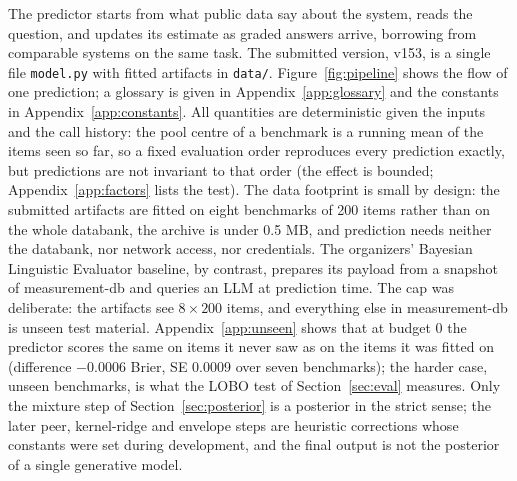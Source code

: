 \documentclass{article}
\begin{document}
The predictor starts from what public data say about the system, reads the question, and updates its estimate as graded answers arrive, borrowing from comparable systems on the same task. The submitted version, v153, is a single file \texttt{model.py} with fitted artifacts in \texttt{data/}. Figure~\ref{fig:pipeline} shows the flow of one prediction; a glossary is given in Appendix~\ref{app:glossary} and the constants in Appendix~\ref{app:constants}. All quantities are deterministic given the inputs and the call history: the pool centre of a benchmark is a running mean of the items seen so far, so a fixed evaluation order reproduces every prediction exactly, but predictions are not invariant to that order (the effect is bounded; Appendix~\ref{app:factors} lists the test). The data footprint is small by design: the submitted artifacts are fitted on eight benchmarks of 200 items rather than on the whole databank, the archive is under 0.5 MB, and prediction needs neither the databank, nor network access, nor credentials. The organizers' Bayesian Linguistic Evaluator baseline, by contrast, prepares its payload from a snapshot of measurement-db and queries an LLM at prediction time. The cap was deliberate: the artifacts see $8\times200$ items, and everything else in measurement-db is unseen test material. Appendix~\ref{app:unseen} shows that at budget 0 the predictor scores the same on items it never saw as on the items it was fitted on (difference $-0.0006$ Brier, SE 0.0009 over seven benchmarks); the harder case, unseen benchmarks, is what the LOBO test of Section~\ref{sec:eval} measures. Only the mixture step of Section~\ref{sec:posterior} is a posterior in the strict sense; the later peer, kernel-ridge and envelope steps are heuristic corrections whose constants were set during development, and the final output is not the posterior of a single generative model.
\end{document}
